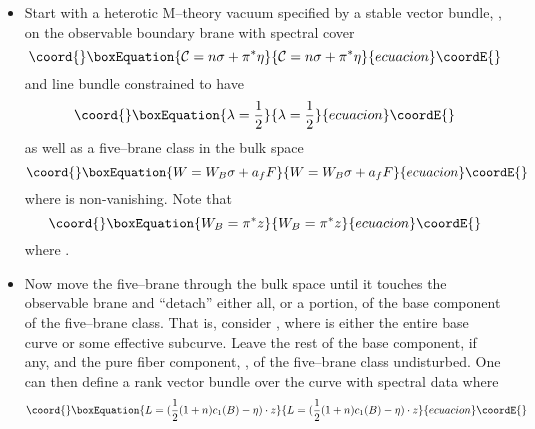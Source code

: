 \documentclass[a4paper,12pt]{article}
\numberwithin{equation}{section}
\def\cN{{\mathcal N}}
\theoremstyle{plain}
\begin{document}
\begin{itemize}

\item Start with a heterotic M--theory vacuum specified by
a stable \coordHE{} vector bundle, \coordHE{}, on the observable boundary
brane with spectral cover
\begin{equation}\coord{}\boxEquation{
{\cal{C}}= n\sigma+ \pi^{*}\eta
\label{eq:91}
}{
{\cal{C}}= n\sigma+ \pi^{*}\eta
}{ecuacion}\coordE{}\end{equation}
and line bundle \myHighlight{$\cN$}\coordHE{} constrained to have
\begin{equation}\coord{}\boxEquation{
\lambda=\frac{1}{2}
\label{eq:92}
}{
\lambda=\frac{1}{2}
}{ecuacion}\coordE{}\end{equation}
as well as a five--brane class in the bulk space 
\begin{equation}\coord{}\boxEquation{
W=W_{B}\sigma +a_{f}F
\label{eq:93}
}{
W=W_{B}\sigma +a_{f}F
}{ecuacion}\coordE{}\end{equation}
where \coordHE{} is non-vanishing. Note that
\begin{equation}\coord{}\boxEquation{
W_{B}=\pi^{*}z
\label{eq:94}
}{
W_{B}=\pi^{*}z
}{ecuacion}\coordE{}\end{equation}
where \coordHE{}.  


\item Now move the five--brane through the bulk space until it touches 
the observable brane and ``detach'' either
all, or a portion, of the base component of the five--brane class.
That is, consider \coordHE{}, where \coordHE{} is either the entire base curve
\coordHE{} or some effective subcurve.
Leave the rest of the base component, if any, and the pure fiber component, 
\coordHE{}, of the five--brane class undisturbed. One can then define a 
rank \coordHE{} vector bundle \coordHE{} over the curve \coordHE{} with spectral data \coordHE{}
where
\begin{equation}\coord{}\boxEquation{
L=(\frac{1}{2}(1+n)c_{1}(B)-\eta) \cdot z
\label{eq:95}
}{
L=(\frac{1}{2}(1+n)c_{1}(B)-\eta) \cdot z
}{ecuacion}\coordE{}\end{equation}


\end{itemize}
\end{document}
